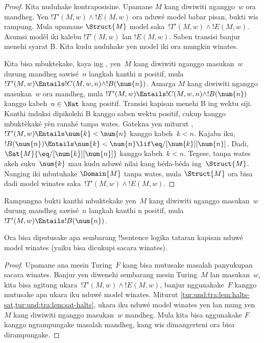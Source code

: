\documentclass[../../../include/open-logic-section]{subfiles}
\begin{document}
\begin{proof}
  Kita nuduhake kontraposisine. Upamane $M$ kang
  diwiwiti nganggo~$w$ ora mandheg. Yen
  $!T'(M,w) \land !E(M,w)$ ora nduwé model babar pisan,
  bukti wis rampung. Mula upamane $\Struct{M}$
  model saka~$!T'(M,w) \land !E(M, w)$. Asumsi modèl iki kalebu $!T'(M,w)$ lan $!E(M,w)$. Saben transisi banjur menehi syarat B.
  Kita kudu nuduhake yen model iki ora mungkin winates.
  
  Kita bisa mbuktekake, kaya ing
  , yen~$M$ kang diwiwiti
  nganggo masukan~$w$ durung mandheg sawisé~$n$
  langkah kanthi n positif, mula $!T'(M,w) \Entails !C(M, w, n)
  \land !B(\num{n})$. Amarga $M$ kang diwiwiti
  nganggo masukan~$w$ ora mandheg, mula
  $!T'(M,w) \Entails !C(M, w, n) \land
  !B(\num{n})$ kanggo kabeh~$n \in \Nat$ kang positif. Transisi kapisan menehi B ing wektu siji. Kanthi induksi dipikolehi B kanggo saben wektu positif, cukup kanggo mbuktèkaké yèn ranahé tanpa wates.
  Gatekna yen miturut ,
  $!T'(M,w) \Entails \num{k} < \num{n}$
  kanggo kabeh~$k < n$. Kajaba iku,
  $!B(\num{n}) \Entails \num{k} < \num{n} \lif
  \eq/[\num{k}][\num{n}]$. Dadi,
  $\Sat{M}{\eq/[\num{k}][\num{n}]}$ kanggo
  kabeh~$k < n$. Tegese, tanpa wates akeh
  suku~$\num{k}$ mau kudu nduwé nilai kang
  béda-béda ing~$\Struct{M}$. Nanging iki
  mbutuhake $\Domain{M}$ tanpa wates, mula
  $\Struct{M}$ ora bisa dadi model winates
  saka~$!T'(M,w) \land !E(M, w)$.
\end{proof}

\begin{prob}
  Rampungna bukti 
  kanthi mbuktekake yen~$M$ kang diwiwiti
  nganggo masukan~$w$ durung mandheg sawisé~$n$
  langkah kanthi n positif, mula $!T'(M,w) \Entails !B(\num{n})$.
\end{prob}

\begin{thm}
  Ora bisa diputusake apa sembarang !!{sentence}
  logika tataran kapisan nduwé model winates
  (yaiku bisa dicukupi sacara winates).
\end{thm}

\begin{proof}
  Upamane ana mesin Turing~$F$ kang bisa mutusake
  masalah panyukupan sacara winates. Banjur yen
  diwenehi sembarang mesin Turing~$M$ lan
  masukan~$w$, kita bisa ngitung
  ukara~$!T'(M,w) \land !E(M,w)$, banjur
  nggunakake~$F$ kanggo mutusake apa ukara iku
  nduwé model winates. Miturut
  \cref{tur:und:tra:lem:halts-sat,tur:und:tra:lem:sat-halts},
  ukara iku nduwé model winates yen lan mung yen
  $M$ kang diwiwiti nganggo masukan~$w$ mandheg.
  Mula kita bisa nggunakake $F$ kanggo ngrampungake
  masalah mandheg, kang wis dimangerteni ora bisa
  dirampungake.
\end{proof}
\end{document}
